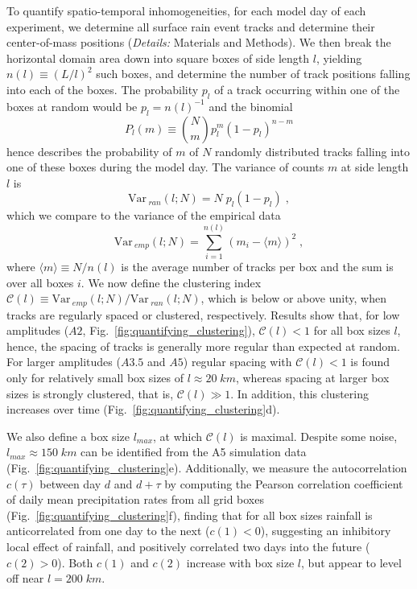 \documentclass[draft,linenumbers]{agujournal2019}
\def\Var{{\textrm{Var}}\,}
\begin{document}
To quantify spatio-temporal inhomogeneities, for each model day of each experiment, we determine all surface rain event tracks and determine their center-of-mass positions ({\it Details:} Materials and Methods).
We then break the horizontal domain area down into square boxes of side length $l$, yielding $n(l)\equiv (L/l)^2$ such boxes, and determine the number of track positions falling into each of the boxes.
The probability $p_l$ of a track occurring within one of the boxes at random would be $p_l=n(l)^{-1}$
and the binomial
\begin{equation}
    P_l(m)\equiv \binom{N}{m} p_l^m\left( 1-p_l \right)^{n-m}
    \label{eq:binomial}
\end{equation}
hence describes the probability of $m$ of $N$ randomly distributed tracks falling into one of these boxes during the model day.
The variance of counts $m$ at side length $l$ is \cite{feller1957introduction} 
\begin{equation}
    \Var_{ran}(l;N) = N\;p_l(1-p_l)\;,
    \label{eq:var_ran}
\end{equation}
which we compare to the variance of the empirical data 
\begin{equation}
    \Var_{emp}(l;N) = \sum_{i=1}^{n(l)}(m_i-\langle m\rangle)^2\;,
    \label{eq:var_emp}
\end{equation}
where $\langle m\rangle\equiv N/n(l)$ is the average number of tracks per box and the sum is over all boxes $i$.
We now define the clustering index $\mathcal{C}(l)\equiv \Var_{emp}(l;N)/\Var_{ran}(l;N)$, which is below or above unity, when tracks are regularly spaced or clustered, respectively.
Results show that, for low amplitudes ($A2$, Fig.~\ref{fig:quantifying_clustering}), $\mathcal{C}(l)<1$ for all box sizes $l$, hence, the spacing of tracks is generally more regular than expected at random.
For larger amplitudes ($A3.5$ and $A5$) regular spacing \cite{tompkins2017organization} with $\mathcal{C}(l)<1$ is found only for relatively small box sizes of $l\approx 20\;km$, whereas spacing at larger box sizes is strongly clustered, that is, $\mathcal{C}(l)\gg 1$.
In addition, this clustering increases over time (Fig.~\ref{fig:quantifying_clustering}d).

We also define a box size $l_{max}$, at which $\mathcal{C}(l)$ is maximal.
Despite some noise, $l_{max}\approx 150\;km$ can be identified from the A5 simulation data (Fig.~\ref{fig:quantifying_clustering}e).
Additionally, we measure the autocorrelation $c(\tau)$ between day $d$ and $d+\tau$ by computing the Pearson correlation coefficient of daily mean precipitation rates from all grid boxes (Fig.~\ref{fig:quantifying_clustering}f), finding that for all box sizes rainfall is anticorrelated from one day to the next ($c(1)<0$), suggesting an inhibitory local effect of rainfall, and positively correlated two days into the future ($c(2)>0$).
Both $c(1)$ and $c(2)$ increase with box size $l$, but appear to level off near $l=200\;km$.
\end{document}
